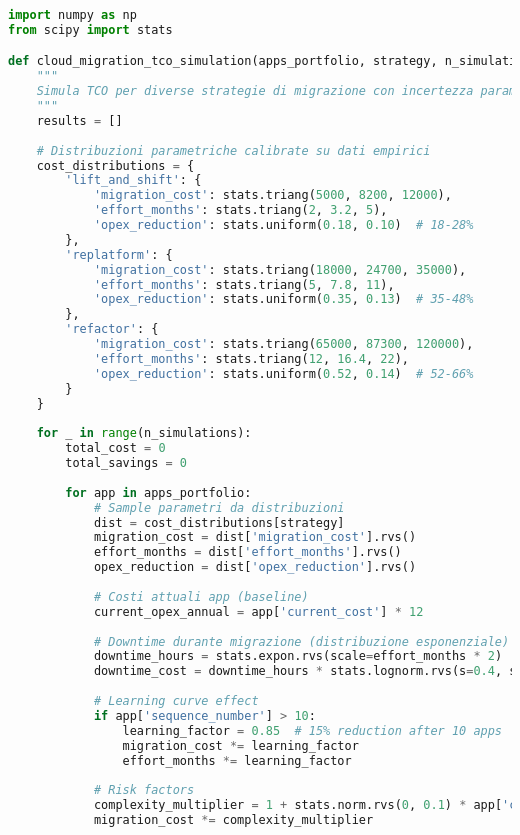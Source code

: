 \begin{lstlisting}[language=Python, caption=Simulazione Monte Carlo TCO Cloud Migration]
import numpy as np
from scipy import stats

def cloud_migration_tco_simulation(apps_portfolio, strategy, n_simulations=10000):
    """
    Simula TCO per diverse strategie di migrazione con incertezza parametrica
    """
    results = []
    
    # Distribuzioni parametriche calibrate su dati empirici
    cost_distributions = {
        'lift_and_shift': {
            'migration_cost': stats.triang(5000, 8200, 12000),
            'effort_months': stats.triang(2, 3.2, 5),
            'opex_reduction': stats.uniform(0.18, 0.10)  # 18-28%
        },
        'replatform': {
            'migration_cost': stats.triang(18000, 24700, 35000),
            'effort_months': stats.triang(5, 7.8, 11),
            'opex_reduction': stats.uniform(0.35, 0.13)  # 35-48%
        },
        'refactor': {
            'migration_cost': stats.triang(65000, 87300, 120000),
            'effort_months': stats.triang(12, 16.4, 22),
            'opex_reduction': stats.uniform(0.52, 0.14)  # 52-66%
        }
    }
    
    for _ in range(n_simulations):
        total_cost = 0
        total_savings = 0
        
        for app in apps_portfolio:
            # Sample parametri da distribuzioni
            dist = cost_distributions[strategy]
            migration_cost = dist['migration_cost'].rvs()
            effort_months = dist['effort_months'].rvs()
            opex_reduction = dist['opex_reduction'].rvs()
            
            # Costi attuali app (baseline)
            current_opex_annual = app['current_cost'] * 12
            
            # Downtime durante migrazione (distribuzione esponenziale)
            downtime_hours = stats.expon.rvs(scale=effort_months * 2)
            downtime_cost = downtime_hours * stats.lognorm.rvs(s=0.4, scale=45000)
            
            # Learning curve effect
            if app['sequence_number'] > 10:
                learning_factor = 0.85  # 15% reduction after 10 apps
                migration_cost *= learning_factor
                effort_months *= learning_factor
            
            # Risk factors
            complexity_multiplier = 1 + stats.norm.rvs(0, 0.1) * app['complexity']
            migration_cost *= complexity_multiplier
            

\end{lstlisting}
